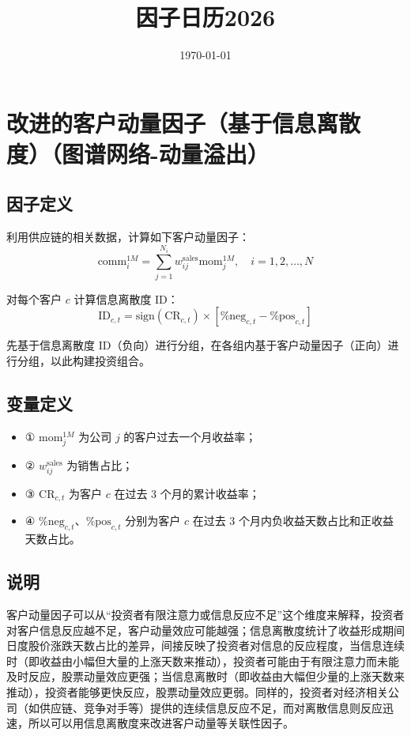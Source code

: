 \documentclass{article}
\title{因子日历2026}
\date{\today}
\begin{document}
\maketitle

\section{改进的客户动量因子（基于信息离散度）（图谱网络-动量溢出）}

\subsection{因子定义}
利用供应链的相关数据，计算如下客户动量因子：
\begin{equation}
    \mathrm{comm}_i^{1M} = \sum_{j=1}^{N_i} w_{ij}^{\mathrm{sales}} \mathrm{mom}_j^{1M}, \quad i=1,2,\ldots,N
\end{equation}

对每个客户 \( c \) 计算信息离散度 ID：
\begin{equation}
    \mathrm{ID}_{c,t} = \mathrm{sign}(\mathrm{CR}_{c,t}) \times [\%\mathrm{neg}_{c,t} - \%\mathrm{pos}_{c,t}]
\end{equation}

先基于信息离散度 ID（负向）进行分组，在各组内基于客户动量因子（正向）进行分组，以此构建投资组合。

\subsection{变量定义}
\begin{itemize}
    \item ① \( \mathrm{mom}_j^{1M} \) 为公司 \( j \) 的客户过去一个月收益率；
    \item ② \( w_{ij}^{\mathrm{sales}} \) 为销售占比；
    \item ③ \( \mathrm{CR}_{c,t} \) 为客户 \( c \) 在过去 3 个月的累计收益率；
    \item ④ \( \%\mathrm{neg}_{c,t} \)、\( \%\mathrm{pos}_{c,t} \) 分别为客户 \( c \) 在过去 3 个月内负收益天数占比和正收益天数占比。
\end{itemize}

\subsection{说明}
客户动量因子可以从“投资者有限注意力或信息反应不足”这个维度来解释，投资者对客户信息反应越不足，客户动量效应可能越强；信息离散度统计了收益形成期间日度股价涨跌天数占比的差异，间接反映了投资者对信息的反应程度，当信息连续时（即收益由小幅但大量的上涨天数来推动），投资者可能由于有限注意力而未能及时反应，股票动量效应更强；当信息离散时（即收益由大幅但少量的上涨天数来推动），投资者能够更快反应，股票动量效应更弱。同样的，投资者对经济相关公司（如供应链、竞争对手等）提供的连续信息反应不足，而对离散信息则反应迅速，所以可以用信息离散度来改进客户动量等关联性因子。
\end{document}
